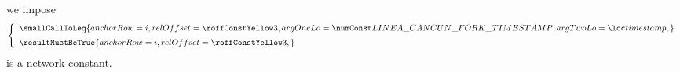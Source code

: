 \item[\underline{\underline{Comparing the timestamp to the \lineaCancunForkTimestamp{}:}}]
	we impose
	\[
		\left\{ \begin{array}{l}
			\smallCallToLeq {
				anchorRow = i                                       ,
				relOffset = \FSEEtimestampToForkTimestampComparison ,
				argOneLo  = \lineaCancunForkTimestamp               ,
				argTwoLo  = \locTimestamp                           ,
			}
			\vspace{2mm} \\
			\resultMustBeTrue {
				anchorRow = i                                       ,
				relOffset = \FSEEtimestampToForkTimestampComparison ,
			}
		\end{array} \right.
	\]
	\saNote{}
	\lineaCancunForkTimestamp{}
	is a network constant.
